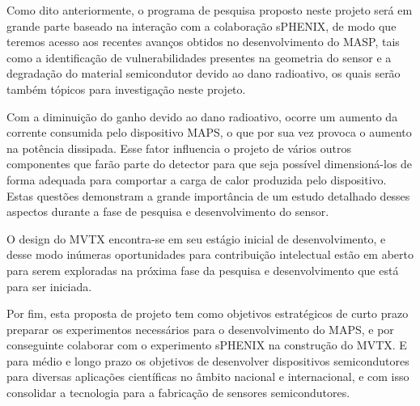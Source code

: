 Como dito anteriormente, o programa de pesquisa proposto neste projeto será em grande parte baseado na interação com a colaboração sPHENIX, de modo que teremos acesso aos recentes avanços obtidos no desenvolvimento do MASP, tais como a identificação de vulnerabilidades presentes na geometria do sensor e a degradação do material semicondutor devido ao dano radioativo, os quais serão também tópicos para investigação neste projeto.

Com a diminuição do ganho devido ao dano radioativo, ocorre um aumento da corrente consumida pelo dispositivo MAPS, o que por sua vez provoca o aumento na potência dissipada. Esse fator influencia o projeto de vários outros componentes que farão parte do detector para que seja possível dimensioná-los de forma adequada para comportar a carga de calor produzida pelo dispositivo. Estas questões  demonstram a grande importância de um estudo detalhado desses aspectos durante a fase de pesquisa e desenvolvimento do sensor. 

O design do MVTX encontra-se em seu estágio inicial de desenvolvimento, e desse modo inúmeras oportunidades para contribuição intelectual estão em aberto para serem exploradas na próxima fase da pesquisa e desenvolvimento que está para ser iniciada. 


Por fim, esta proposta de projeto tem como objetivos estratégicos de curto prazo preparar os experimentos necessários para o desenvolvimento do MAPS, e por conseguinte colaborar com o experimento sPHENIX na construção do MVTX. E para médio e longo prazo os objetivos de desenvolver dispositivos semicondutores para diversas aplicações científicas no âmbito nacional e internacional, e com isso consolidar a tecnologia para a fabricação de sensores semicondutores.














